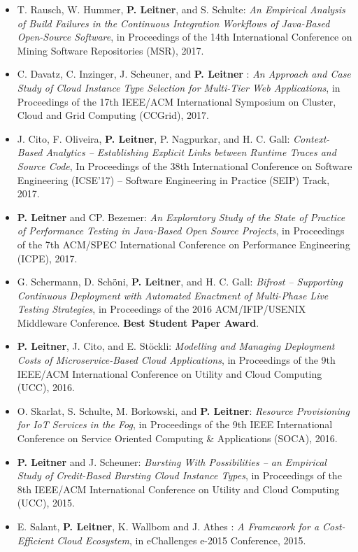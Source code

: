 \documentclass[paper=letter,fontsize=11pt]{scrartcl} %
\begin{document}
\begin{itemize}
	\item T. Rausch, W. Hummer, \textbf{P. Leitner}, and S. Schulte: \emph{An Empirical Analysis of Build Failures in the Continuous Integration Workflows of Java-Based Open-Source Software}, in Proceedings of the 14th International Conference on Mining Software Repositories (MSR), 2017.
	\item C. Davatz, C. Inzinger, J. Scheuner, and \textbf{P. Leitner} : \emph{An Approach and Case Study of Cloud Instance Type Selection for Multi-Tier Web Applications}, in Proceedings of the 17th IEEE/ACM International Symposium on Cluster, Cloud and Grid Computing (CCGrid), 2017.
	\item J. Cito, F. Oliveira, \textbf{P. Leitner}, P. Nagpurkar, and H. C. Gall: \emph{Context-Based Analytics – Establishing Explicit Links between Runtime Traces and Source Code}, In Proceedings of the 38th International Conference on Software Engineering (ICSE'17) -- Software Engineering in Practice (SEIP) Track, 2017.
        \item \textbf{P. Leitner} and CP. Bezemer: \emph{An Exploratory Study of the State of Practice of Performance Testing in Java-Based Open Source Projects}, in  Proceedings of the 7th ACM/SPEC International Conference on Performance Engineering (ICPE), 2017.
	\item G. Schermann, D. Sch\"oni, \textbf{P. Leitner}, and H. C. Gall: \emph{Bifrost -- Supporting Continuous Deployment with Automated Enactment of Multi-Phase Live Testing Strategies}, in Proceedings of the 2016 ACM/IFIP/USENIX Middleware Conference. \textbf{Best Student Paper Award}.
	\item \textbf{P. Leitner}, J. Cito, and E. St\"ockli: \emph{Modelling and Managing Deployment Costs of Microservice-Based Cloud Applications}, in Proceedings of the 9th IEEE/ACM International Conference on Utility and Cloud Computing (UCC), 2016.
  \item O. Skarlat, S. Schulte, M. Borkowski, and \textbf{P. Leitner}: \emph{Resource Provisioning for IoT Services in the Fog}, in Proceedings of the 9th IEEE International Conference on Service Oriented Computing \& Applications (SOCA), 2016.
	\item \textbf{P. Leitner} and J. Scheuner: \emph{Bursting With Possibilities -- an Empirical Study of Credit-Based Bursting Cloud Instance Types}, in Proceedings of the 8th IEEE/ACM International Conference on Utility and Cloud Computing (UCC), 2015.
  \item E. Salant, \textbf{P. Leitner}, K. Wallbom and J. Athes : \emph{A Framework for a Cost-Efficient Cloud Ecosystem}, in eChallenges e-2015 Conference, 2015.

\end{itemize}
\end{document}
